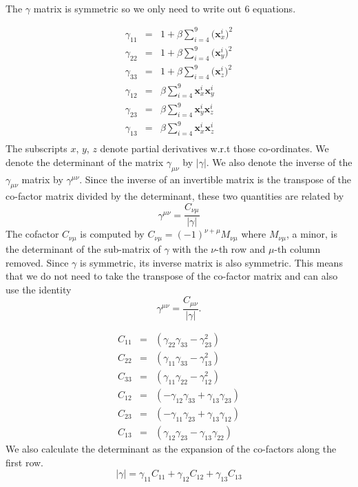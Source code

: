 \documentclass[12pt]{article}
\newcommand{\vect}[1]{\mathbf{#1}}
\begin{document}
\ 

\noindent
The $\gamma$ matrix is symmetric so we only need to write out 6 equations. 

\begin{eqnarray*}
\gamma_{1 1} & = & 1 + \beta \sum_{i=4}^9 
  \big(\vect{x}^i_x\big)^2 \\
\gamma_{2 2} &=& 1 + \beta \sum_{i=4}^9 
  \big(\vect{x}^i_y\big)^2 \\
\gamma_{3 3} &=& 1 + \beta \sum_{i=4}^9 
  \big(\vect{x}^i_z\big)^2 \\
\gamma_{1 2} &=& \beta \sum_{i=4}^9 \vect{x}^i_x  \vect{x}^i_y  \\
\gamma_{2 3} &=& \beta \sum_{i=4}^9 \vect{x}^i_y \vect{x}^i_z  \\
\gamma_{1 3} &=& \beta \sum_{i=4}^9 \vect{x}^i_x \vect{x}^i_z  \\
\end{eqnarray*}
The subscripts $x$, $y$, $z$ denote partial derivatives w.r.t those co-ordinates.
We denote the determinant of the matrix $\gamma_{\mu \nu}$ by $|\gamma|$. We
also denote the inverse of the $\gamma_{\mu \nu}$ matrix by $\gamma^{\mu \nu}$.
Since the inverse of an invertible matrix is the transpose of the co-factor
matrix divided by the determinant, these two quantities are related by 
$$\gamma^{\mu \nu} = \frac{C_{\nu \mu}}{|\gamma|}$$
The cofactor $C_{\nu \mu}$ is computed by $C_{\nu \mu} = (-1)^{\nu + \mu}
M_{\nu \mu}$ where $M_{\nu \mu}$, a minor, is the determinant of the sub-matrix
of $\gamma$ with the $\nu$-th row and $\mu$-th column removed. Since $\gamma$
is symmetric, its inverse matrix is also symmetric. This means that we do not
need to take the transpose of the co-factor matrix and can also use the
identity $$\gamma^{\mu \nu} = \frac{C_{\mu \nu}}{|\gamma|}.$$

\begin{eqnarray*}
C_{1 1} &=&  (\gamma_{2 2} \gamma_{3 3} - \gamma_{2 3}^2) \\
C_{2 2} &=&  (\gamma_{1 1} \gamma_{3 3} - \gamma_{1 3}^2) \\
C_{3 3} &=&  (\gamma_{1 1} \gamma_{2 2} - \gamma_{1 2}^2) \\
C_{1 2} &=& (-\gamma_{1 2} \gamma_{3 3} + \gamma_{1 3} \gamma_{2 3}) \\
C_{2 3} &=& (-\gamma_{1 1} \gamma_{2 3} + \gamma_{1 3} \gamma_{1 2}) \\
C_{1 3} &=&  (\gamma_{1 2} \gamma_{2 3} - \gamma_{1 3} \gamma_{2 2}) 
\end{eqnarray*}
We also calculate the determinant as the expansion of the co-factors along the first row. 
$$|\gamma| = \gamma_{1 1} C_{1 1} + \gamma_{1 2} C_{1 2} + 
             \gamma_{1 3} C_{1 3}$$
\end{document}
